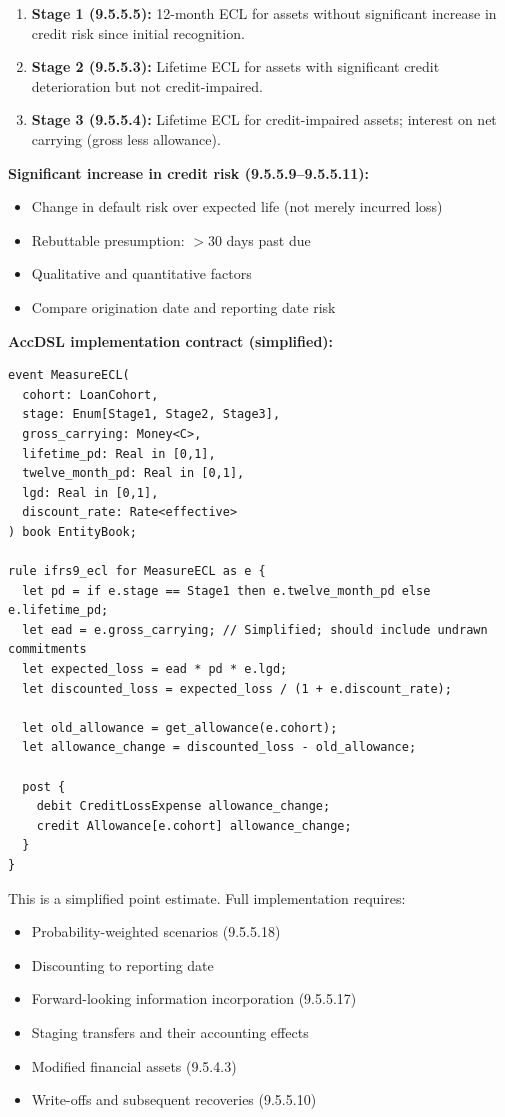 \begin{enumerate}
\item \textbf{Stage 1 (9.5.5.5):} 12-month ECL for assets without significant increase
in credit risk since initial recognition.
\item \textbf{Stage 2 (9.5.5.3):} Lifetime ECL for assets with significant credit
deterioration but not credit-impaired.
\item \textbf{Stage 3 (9.5.5.4):} Lifetime ECL for credit-impaired assets; interest
on net carrying (gross less allowance).
\end{enumerate}

\textbf{Significant increase in credit risk (9.5.5.9--9.5.5.11):}
\begin{itemize}
\item Change in default risk over expected life (not merely incurred loss)
\item Rebuttable presumption: $>30$ days past due
\item Qualitative and quantitative factors
\item Compare origination date and reporting date risk
\end{itemize}

\textbf{AccDSL implementation contract (simplified):}

\begin{lstlisting}
event MeasureECL(
  cohort: LoanCohort,
  stage: Enum[Stage1, Stage2, Stage3],
  gross_carrying: Money<C>,
  lifetime_pd: Real in [0,1],
  twelve_month_pd: Real in [0,1],
  lgd: Real in [0,1],
  discount_rate: Rate<effective>
) book EntityBook;

rule ifrs9_ecl for MeasureECL as e {
  let pd = if e.stage == Stage1 then e.twelve_month_pd else e.lifetime_pd;
  let ead = e.gross_carrying; // Simplified; should include undrawn commitments
  let expected_loss = ead * pd * e.lgd;
  let discounted_loss = expected_loss / (1 + e.discount_rate);

  let old_allowance = get_allowance(e.cohort);
  let allowance_change = discounted_loss - old_allowance;

  post {
    debit CreditLossExpense allowance_change;
    credit Allowance[e.cohort] allowance_change;
  }
}
\end{lstlisting}

 This is a simplified point estimate. Full implementation
requires:
\begin{itemize}
\item Probability-weighted scenarios (9.5.5.18)
\item Discounting to reporting date
\item Forward-looking information incorporation (9.5.5.17)
\item Staging transfers and their accounting effects
\item Modified financial assets (9.5.4.3)
\item Write-offs and subsequent recoveries (9.5.5.10)
\end{itemize}

